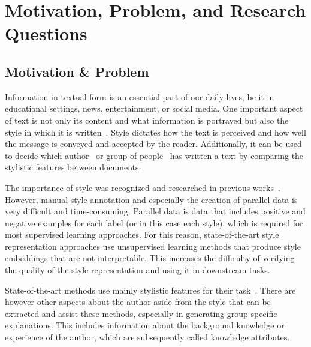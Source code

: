 
\section{Motivation, Problem, and Research Questions}

\subsection{Motivation \& Problem}
Information in textual form is an essential part of our daily lives, be it in educational settings, news, entertainment, or social media. One important aspect of text is not only its content and what information is portrayed but also the style in which it is written~\cite{wegmannSameAuthorJust2022}. Style dictates how the text is perceived and how well the message is conveyed and accepted by the reader. Additionally, it can be used to decide which author~\cite{alshomaryLatentSpaceInterpretation2024} or group of people~\cite{10.1007/978-3-642-29047-3_27} has written a text by comparing the stylistic features between documents.

The importance of style was recognized and researched in previous works~\cite{zhu-etal-2024-styleflow, ijcai2020p526,wegmannSameAuthorJust2022}. However, manual style annotation and especially the creation of parallel data is very difficult and time-consuming. Parallel data is data that includes positive and negative examples for each label (or in this case each style), which is required for most supervised learning approaches. For this reason, state-of-the-art style representation approaches use unsupervised learning methods that produce style embeddings that are not interpretable. This increases the difficulty of verifying the quality of the style representation and using it in downstream tasks.

State-of-the-art methods use mainly stylistic features for their task~\cite{alshomaryLatentSpaceInterpretation2024,patelLearningInterpretableStyle2023,konenStyleVectorsSteering2024,zhu-etal-2024-styleflow}. There are however other aspects about the author aside from the style that can be extracted and assist these methods, especially in generating group-specific explanations. This includes information about the background knowledge or experience of the author, which are subsequently called knowledge attributes.

